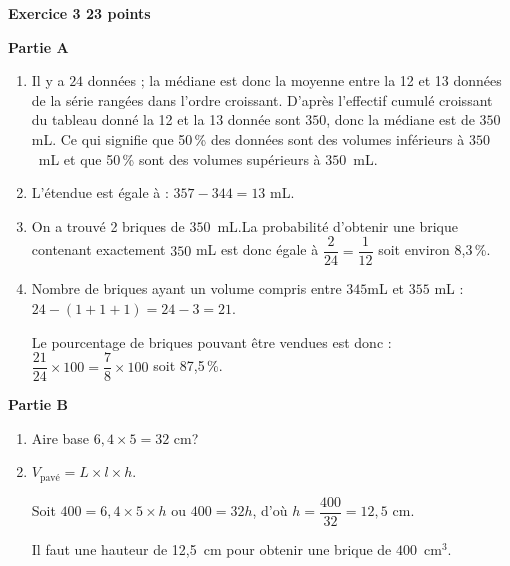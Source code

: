 \textbf{\large Exercice 3 \hfill 23 points}

\medskip

\textbf{Partie A}

\medskip

\begin{enumerate}
\item Il y a $24$ données  ; la médiane est donc la moyenne entre la 12 et 13 données de la série rangées dans l'ordre croissant. D'après l'effectif cumulé croissant du tableau donné la 12 et la 13 donnée sont $350$, donc la médiane est de $350$ mL. Ce qui signifie que 50\,\% des données sont des volumes inférieurs à $350$~mL et que 50\,\% sont des volumes supérieurs à $350$~mL.
\item L'étendue est égale à : $357 - 344 = 13$ mL.
\item On a trouvé 2 briques de $350$~mL.La probabilité d'obtenir une brique contenant exactement $350$ mL est donc égale à $\dfrac{2}{24} = \dfrac{1}{12}$ soit environ 8,3\,\%.
\item 
Nombre de briques ayant un volume compris entre $345$mL et $355$ mL :
$24 - (1 + 1 + 1) = 24 - 3 = 21$.

Le pourcentage de briques pouvant être vendues est donc : $\dfrac{21}{24} \times 100 = \dfrac78 \times 100$ soit  87,5\,\%.
\end{enumerate}

\textbf{Partie B}

\medskip

\begin{enumerate}
\item Aire base  $6,4 \times 5 = 32$ cm?
\item $V_{\text{pavé}} = L \times l \times h$.

Soit $400 = 6,4 \times 5 \times  h$ ou $400 = 32h$, d'où $h = \dfrac{400}{32} = 12,5$ cm.

Il faut une hauteur de 12,5~cm pour obtenir une brique de $400$~cm$^3$.
\end{enumerate}

\bigskip

